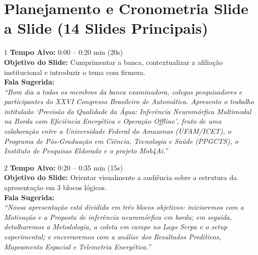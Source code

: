 \documentclass[11pt,a4paper]{article}
\begin{document}
\tableofcontents
\newpage

\section{Planejamento e Cronometria Slide a Slide (14 Slides Principais)}

\begin{slidebox}{1}
\textbf{Tempo Alvo:} 0:00 -- 0:20 min (20s)\\[3pt]
\textbf{Objetivo do Slide:} Cumprimentar a banca, contextualizar a afiliação institucional e introduzir o tema com firmeza.\\[3pt]
\textbf{Fala Sugerida:}\\
\textit{``Bom dia a todos os membros da banca examinadora, colegas pesquisadores e participantes do XXVI Congresso Brasileiro de Automática. Apresento o trabalho intitulado `Previsão da Qualidade da Água: Inferência Neuromórfica Multimodal na Borda com Eficiência Energética e Operação Offline', fruto de uma colaboração entre a Universidade Federal do Amazonas (UFAM/ICET), o Programa de Pós-Graduação em Ciência, Tecnologia e Saúde (PPGCTS), o Instituto de Pesquisas Eldorado e o projeto Mob4Ai.''}
\end{slidebox}

\begin{slidebox}{2}
\textbf{Tempo Alvo:} 0:20 -- 0:35 min (15s)\\[3pt]
\textbf{Objetivo do Slide:} Orientar visualmente a audiência sobre a estrutura da apresentação em 3 blocos lógicos.\\[3pt]
\textbf{Fala Sugerida:}\\
\textit{``Nossa apresentação está dividida em três blocos objetivos: iniciaremos com a Motivação e a Proposta de inferência neuromórfica em borda; em seguida, detalharemos a Metodologia, a coleta em campo no Lago Serpa e o setup experimental; e encerraremos com a análise dos Resultados Preditivos, Mapeamento Espacial e Telemetria Energética.''}
\end{slidebox}
\end{document}
